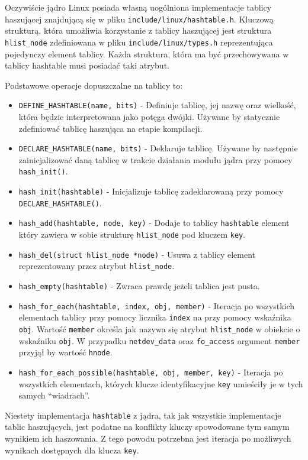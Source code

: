 \documentclass[10pt]{article}
\begin{document}
Oczywiście jądro Linux posiada własną uogólniona implementacje tablicy haszującej znajdującą się w pliku \texttt{include/linux/hashtable.h}.  Kluczową strukturą, która umożliwia korzystanie z tablicy haszującej jest struktura \texttt{hlist\_node} zdefiniowana w pliku \texttt{include/linux/types.h} reprezentująca pojedynczy element tablicy. Każda struktura, która ma być przechowywana w tablicy hashtable musi posiadać taki atrybut.

Podstawowe operacje dopuszczalne na tablicy to:

\begin{itemize}
\itemsep1pt\parskip0pt
\item
  \texttt{DEFINE\_HASHTABLE(name, bits)} - Definiuje tablicę, jej nazwę oraz wielkość, która będzie interpretowana jako potęga dwójki. Używane by statycznie zdefiniować tablicę haszująca na etapie kompilacji.
\item
  \texttt{DECLARE\_HASHTABLE(name, bits)} - Deklaruje tablicę. Używane by następnie zainicjalizować daną tablicę w trakcie działania modułu jądra przy pomocy \texttt{hash\_init()}.
\item
  \texttt{hash\_init(hashtable)} - Inicjalizuje tablicę zadeklarowaną przy pomocy \texttt{DECLARE\_HASHTABLE()}.
\item
  \texttt{hash\_add(hashtable, node, key)} - Dodaje to tablicy \texttt{hashtable} element który zawiera w sobie strukturę \texttt{hlist\_node} pod kluczem \texttt{key}.
\item
  \texttt{hash\_del(struct hlist\_node *node)} - Usuwa z tablicy element reprezentowany przez atrybut \texttt{hlist\_node}.
\item
  \texttt{hash\_empty(hashtable)} - Zwraca prawdę jeżeli tablica jest pusta.
\item
  \texttt{hash\_for\_each(hashtable, index, obj, member)} - Iteracja po wszystkich elementach tablicy przy pomocy licznika \texttt{index} na przy pomocy wskaźnika \texttt{obj}. Wartość \texttt{member} określa jak nazywa się atrybut \texttt{hlist\_node} w obiekcie o wskaźniku \texttt{obj}. W przypadku \texttt{netdev\_data} oraz \texttt{fo\_access} argument \texttt{member} przyjął by wartość \texttt{hnode}.
\item
  \texttt{hash\_for\_each\_possible(hashtable, obj, member, key)} - Iteracja po wszystkich elementach, których klucze identyfikacyjne \texttt{key} umieściły je w tych samych ``wiadrach''.
\end{itemize}

Niestety implementacja \texttt{hashtable} z jądra, tak jak wszystkie implementacje tablic haszujących, jest podatne na konflikty kluczy spowodowane tym samym wynikiem ich haszowania. Z tego powodu potrzebna jest iteracja po możliwych wynikach dostępnych dla klucza \texttt{key}.
\end{document}
